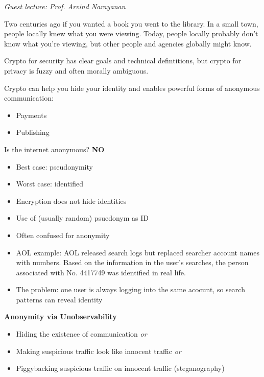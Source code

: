 \textit{Guest lecture: Prof. Arvind Narayanan}

Two centuries ago if you wanted a book you went to the library. In a small town, people locally knew what you were viewing. Today, people locally probably don't know what you're viewing, but other people and agencies globally might know.

Crypto for security has clear goals and technical defintitions, but crypto for privacy is fuzzy and often morally ambiguous.

Crypto can help you hide your identity and enables powerful forms of anonymous communication:
\begin{itemize}
    \item Payments
    \item Publishing
\end{itemize}

Is the internet anonymous? {\bf NO}
\begin{itemize}
    \item Best case: pseudonymity
    \item Worst case: identified
    \item Encryption does not hide identities
\end{itemize}
\begin{itemize}
    \item Use of (usually random) psuedonym as ID
    \item Often confused for anonymity
    \item AOL example: AOL released search logs but replaced searcher account names with numbers. Based on the information in the user's searches, the person associated with No. 4417749 was identified in real life.
    \item The problem: one user is always logging into the same acocunt, so search patterns can reveal identity
\end{itemize}

\medskip
{\bf Anonymity via Unobservability}
\begin{itemize}
    \item Hiding the existence of communication {\it or}
    \item Making suspicious traffic look like innocent traffic {\it or}
    \item Piggybacking suspicious traffic on innocent traffic (steganography)
\end{itemize}

